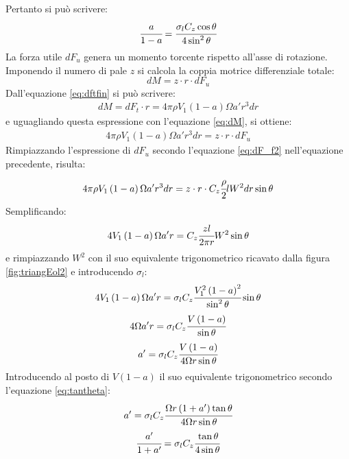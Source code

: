 Pertanto si può scrivere:
\begin{equation}\label{eq:asolid}
\cfrac{a}{1-a} = \cfrac{\sigma_l C_z \cos \theta}{4 \sin^2 \theta}
\end{equation}
La forza utile $dF_u$ genera un momento torcente rispetto all'asse di rotazione. Imponendo il numero di pale $z$ si calcola la coppia motrice differenziale totale:
\begin{equation}\label{eq:dM}
dM = z \cdot r \cdot dF_u
\end{equation}
Dall'equazione \ref{eq:dftfin} si può scrivere:
\begin{align*}
dM = dF_t \cdot r = 4 \pi \rho V_1 \left( 1- a \right) \Omega a' r^3 dr
\end{align*}
e uguagliando questa espressione con l'equazione \ref{eq:dM}, si ottiene:
\begin{align*}
4 \pi \rho V_1 \left(1-a \right) \Omega a' r^3 dr = z \cdot r \cdot dF_u
\end{align*}
Rimpiazzando l'espressione di $dF_u$ secondo l'equazione \ref{eq:dF_f2} nell'equazione precedente, risulta:
\begin{align*}
4 \pi \rho V_1 \left(1-a \right) \Omega a' r^3 dr = z \cdot r \cdot C_z \cfrac{\rho}{2} l W^2 dr \sin \theta
\end{align*}
Semplificando:
\begin{align*}
4 V_1 \left(1-a \right) \Omega a' r = C_z \cfrac{z l }{2 \pi r} W^2 \sin \theta
\end{align*}
e rimpiazzando $W^2$ con il suo equivalente trigonometrico ricavato dalla figura \ref{fig:triangEol2} e introducendo $\sigma_l$:
\begin{align*}
4 V_1 \left(1-a \right) \Omega a' r = \sigma_l C_z \cfrac{V_1^2 \left(1-a \right)^2}{\sin^2 \theta} \sin \theta
\end{align*}
\begin{align*}
4 \Omega a' r = \sigma_l C_z \cfrac{V \left(1-a \right)}{\sin \theta}
\end{align*}
\begin{align*}
a'= \sigma_l C_z \cfrac{V \left(1-a \right)}{4 \Omega r \sin \theta}
\end{align*}
Introducendo al posto di $V \left(1-a\right)$ il suo equivalente trigonometrico secondo l'equazione \ref{eq:tantheta}:
\begin{align*}
a' = \sigma_l C_z \cfrac{\Omega r \left(1+a' \right) \tan \theta}{4 \Omega r \sin \theta}
\end{align*}
\begin{align*}
\cfrac{a'}{1+a'} = \sigma_l C_z \cfrac{\tan \theta}{4 \sin \theta}
\end{align*}
